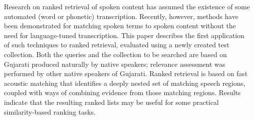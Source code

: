 Research on ranked retrieval of spoken content has assumed the existence of some automated (word or phonetic) transcription. Recently, however, methods have been demonstrated for matching spoken terms to spoken content without the need for language-tuned transcription. This paper describes the first application of such techniques to ranked retrieval, evaluated using a newly created test collection. Both the queries and the collection to be searched are based on Gujarati produced naturally by native speakers; relevance assessment was performed by other native speakers of Gujarati. Ranked retrieval is based on fast acoustic matching that identifies a deeply nested set of matching speech regions, coupled with ways of combining evidence from those matching regions. Results indicate that the resulting ranked lists may be useful for some practical similarity-based ranking tasks.
